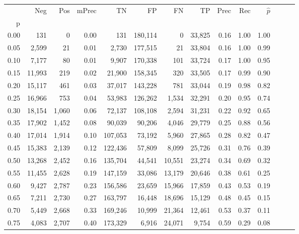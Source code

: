 \begin{tabular}{rrrrrrrrrrrrrr}
\toprule
{} &     Neg &    Pos & mPrec &       TN &       FP &      FN &      TP &  Prec &   Rec & $\hat{p}$ \\
p    &         &        &       &          &          &         &         &       &       &           \\
\midrule
0.00 &     131 &      0 &  0.00 &      131 &  180,114 &       0 &  33,825 &  0.16 &  1.00 &      1.00 \\
0.05 &   2,599 &     21 &  0.01 &    2,730 &  177,515 &      21 &  33,804 &  0.16 &  1.00 &      0.99 \\
0.10 &   7,177 &     80 &  0.01 &    9,907 &  170,338 &     101 &  33,724 &  0.17 &  1.00 &      0.95 \\
0.15 &  11,993 &    219 &  0.02 &   21,900 &  158,345 &     320 &  33,505 &  0.17 &  0.99 &      0.90 \\
0.20 &  15,117 &    461 &  0.03 &   37,017 &  143,228 &     781 &  33,044 &  0.19 &  0.98 &      0.82 \\
0.25 &  16,966 &    753 &  0.04 &   53,983 &  126,262 &   1,534 &  32,291 &  0.20 &  0.95 &      0.74 \\
0.30 &  18,154 &  1,060 &  0.06 &   72,137 &  108,108 &   2,594 &  31,231 &  0.22 &  0.92 &      0.65 \\
0.35 &  17,902 &  1,452 &  0.08 &   90,039 &   90,206 &   4,046 &  29,779 &  0.25 &  0.88 &      0.56 \\
0.40 &  17,014 &  1,914 &  0.10 &  107,053 &   73,192 &   5,960 &  27,865 &  0.28 &  0.82 &      0.47 \\
0.45 &  15,383 &  2,139 &  0.12 &  122,436 &   57,809 &   8,099 &  25,726 &  0.31 &  0.76 &      0.39 \\
0.50 &  13,268 &  2,452 &  0.16 &  135,704 &   44,541 &  10,551 &  23,274 &  0.34 &  0.69 &      0.32 \\
0.55 &  11,455 &  2,628 &  0.19 &  147,159 &   33,086 &  13,179 &  20,646 &  0.38 &  0.61 &      0.25 \\
0.60 &   9,427 &  2,787 &  0.23 &  156,586 &   23,659 &  15,966 &  17,859 &  0.43 &  0.53 &      0.19 \\
0.65 &   7,211 &  2,730 &  0.27 &  163,797 &   16,448 &  18,696 &  15,129 &  0.48 &  0.45 &      0.15 \\
0.70 &   5,449 &  2,668 &  0.33 &  169,246 &   10,999 &  21,364 &  12,461 &  0.53 &  0.37 &      0.11 \\
0.75 &   4,083 &  2,707 &  0.40 &  173,329 &    6,916 &  24,071 &   9,754 &  0.59 &  0.29 &      0.08 \\

\end{tabular}
